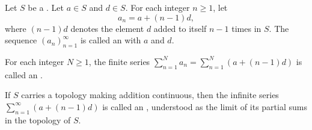 \begin{definition} \label{definition:arithmetic_progression_and_arithmetic_series_in_a_commutative_semiring}
    Let $S$ be a . Let $a \in S$ and $d \in S$. For each integer $n \geq 1$, let
    $$a_n = a + (n-1)d,$$
    where $(n-1)d$ denotes the element $d$ added to itself $n-1$ times in $S$. The sequence $(a_n)_{n=1}^\infty$ is called an  with  $a$ and  $d$.

    For each integer $N \geq 1$, the finite series $\sum_{n=1}^N a_n = \sum_{n=1}^N (a + (n-1)d)$ is called an .

    If $S$ carries a topology making addition continuous, then the infinite series $\sum_{n=1}^\infty (a + (n-1)d)$ is called an , understood as the limit of its partial sums in the topology of $S$.
\end{definition}
